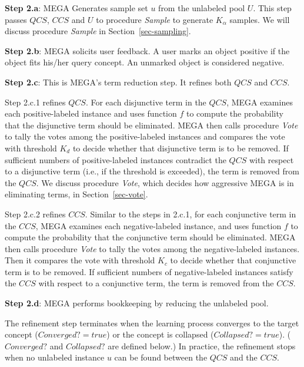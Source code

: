 \begin{nlist}
\item {\bf Step 2.a}: 
MEGA Generates
sample set $u$ from the unlabeled pool $U$.
This step passes $QCS$, $CCS$ and $U$ to procedure {\it Sample}
to generate $K_{\alpha}$ samples.
We will discuss procedure {\it Sample} in Section~\ref{sec-sampling}.

\item {\bf Step 2.b}: MEGA solicits user feedback. A user marks
an object positive if the object fits his/her query
concept.  An unmarked object is considered negative. 

\item {\bf Step 2.c}: 
This is MEGA's term reduction step. It
refines both $QCS$ and $CCS$. 

{Step 2.c.1} refines $QCS$.  For each disjunctive term in the $QCS$, 
MEGA examines each positive-labeled instance
and uses function $f$ to compute the probability that
the disjunctive term should be eliminated.
MEGA then calls procedure {\it Vote} to tally the votes among the
positive-labeled instances and compares the vote with threshold $K_d$
to decide whether that disjunctive term is to be removed. 
If sufficient numbers of positive-labeled instances contradict the
$QCS$ with respect to a disjunctive term (i.e., if the
threshold is exceeded), the term is removed from the $QCS$.
We discuss procedure {\it Vote}, which decides how
aggressive MEGA is in eliminating terms, in Section~\ref{sec-vote}.

{Step 2.c.2} refines $CCS$.
Similar to the steps in 2.c.1, for each conjunctive term in
the $CCS$, MEGA examines each negative-labeled instance,
and uses function $f$ to compute the probability that
the conjunctive term should be eliminated.
MEGA then calls procedure {\it Vote}
to tally the votes among the
negative-labeled instances.
Then it compares the vote with threshold $K_c$
to decide whether that conjunctive term is to be removed.
If sufficient numbers of negative-labeled 
instances satisfy the $CCS$ with respect to
a conjunctive term, the term is removed from the $CCS$.

\item {\bf Step 2.d}: MEGA performs bookkeeping by reducing the
unlabeled pool.
\end{nlist}

The refinement step terminates when the learning
process converges to the target concept ($Converged?=true$) or the
concept is collapsed ($Collapsed?=true$).  ($Converged?$ and
$Collapsed?$ are defined below.)
In practice, the refinement stops when no unlabeled instance
$u$ can be found between the $QCS$ and the $CCS$.

